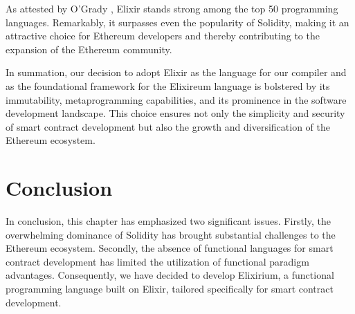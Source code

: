 As attested by O'Grady \cite{RedMonk}, Elixir stands strong among the top 50 programming languages. Remarkably, it surpasses even the popularity of Solidity, making it an attractive choice for Ethereum developers and thereby contributing to the expansion of the Ethereum community.

In summation, our decision to adopt Elixir as the language for our compiler and as the foundational framework for the Elixireum language is bolstered by its immutability, metaprogramming capabilities, and its prominence in the software development landscape. This choice ensures not only the simplicity and security of smart contract development but also the growth and diversification of the Ethereum ecosystem.

\section{Conclusion}
\label{sec:conc}

In conclusion, this chapter has emphasized two significant issues. Firstly, the overwhelming dominance of Solidity has brought substantial challenges to the Ethereum ecosystem. Secondly, the absence of functional languages for smart contract development has limited the utilization of functional paradigm advantages. Consequently, we have decided to develop Elixirium, a functional programming language built on Elixir, tailored specifically for smart contract development.
